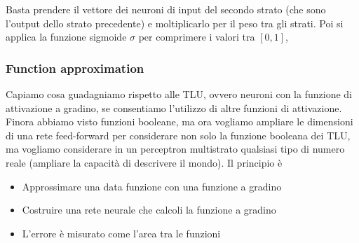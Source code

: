 Basta prendere il vettore dei neuroni di input del secondo strato (che sono l'output dello strato precedente) e moltiplicarlo per il peso tra gli strati. Poi si applica la funzione sigmoide $\sigma$ per comprimere i valori tra $[0, 1]$,

\subsubsection{Function approximation}
Capiamo cosa guadagniamo rispetto alle TLU, ovvero neuroni con la funzione di attivazione a gradino, se consentiamo l'utilizzo di altre funzioni di attivazione. Finora abbiamo visto funzioni booleane, ma ora vogliamo ampliare le dimensioni di una rete feed-forward per considerare non solo la funzione booleana dei TLU, ma vogliamo considerare in un perceptron multistrato qualsiasi tipo di numero reale (ampliare la capacità di descrivere il mondo). Il principio è
\begin{itemize}
    \item Approssimare una data funzione con una funzione a gradino
    \item Costruire una rete neurale che calcoli la funzione a gradino
    \item L'errore è misurato come l'area tra le funzioni
\end{itemize}


